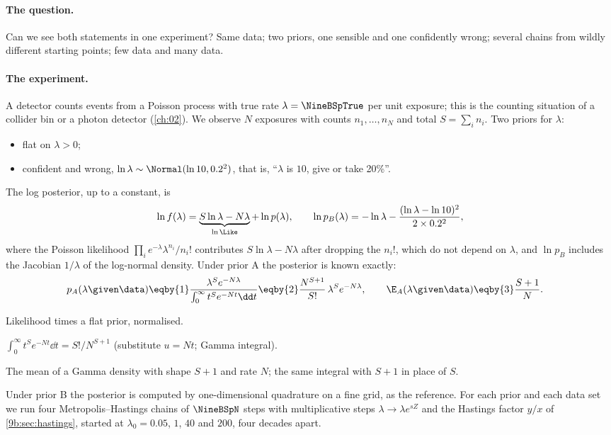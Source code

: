 \paragraph{The question.} Can we see both statements in one experiment? Same data; two priors,
one sensible and one confidently wrong; several chains from wildly different starting points; few
data and many data.

\paragraph{The experiment.}
A detector counts events from a Poisson process with true rate $\lambda=\NineBSpTrue$ per unit
exposure; this is the counting situation of a collider bin or a photon detector (\cref{ch:02}).
We observe $N$ exposures with counts $n_1,\dots,n_N$ and total $S=\sum_in_i$. Two priors for
$\lambda$:
\begin{itemize}[itemsep=1pt]
  \item[A:] flat on $\lambda>0$;
  \item[B:] confident and wrong, $\ln\lambda\sim\Normal(\ln10,0.2^2)$, that is,
        ``$\lambda$ is $10$, give or take 20\%''.
\end{itemize}
The log posterior, up to a constant, is
\begin{equation}
  \ln f(\lambda)=\underbrace{S\ln\lambda-N\lambda}_{\ln\Like}+\ln p(\lambda),
  \qquad
  \ln p_B(\lambda)=-\ln\lambda-\frac{(\ln\lambda-\ln10)^2}{2\times0.2^2},
  \label{9b:eq:poisson-post}
\end{equation}
where the Poisson likelihood $\prod_ie^{-\lambda}\lambda^{n_i}/n_i!$ contributes $S\ln\lambda-N\lambda$
after dropping the $n_i!$, which do not depend on $\lambda$, and $\ln p_B$ includes the Jacobian
$1/\lambda$ of the log-normal density. Under prior A the posterior is known exactly:
\begin{align*}
  p_A(\lambda\given\data)
  &\eqby{1}\frac{\lambda^Se^{-N\lambda}}{\int_0^\infty t^Se^{-Nt}\dd t}
   \eqby{2}\frac{N^{S+1}}{S!}\,\lambda^Se^{-N\lambda},
  \qquad
  \E_A(\lambda\given\data)\eqby{3}\frac{S+1}{N}.
\end{align*}
\begin{explain}
  \item Likelihood times a flat prior, normalised.
  \item $\int_0^\infty t^Se^{-Nt}\dd t=S!/N^{S+1}$ (substitute $u=Nt$; Gamma integral).
  \item The mean of a Gamma density with shape $S+1$ and rate $N$; the same integral with $S+1$
        in place of $S$.
\end{explain}
Under prior B the posterior is computed by one-dimensional quadrature on a fine grid, as the
reference. For each prior and each data set we run four Metropolis--Hastings chains of
$\NineBSpN$ steps with multiplicative steps $\lambda\to\lambda e^{sZ}$ and the Hastings factor
$y/x$ of \cref{9b:sec:hastings}, started at $\lambda_0=0.05$, $1$, $40$ and $200$, four decades
apart.

